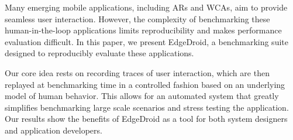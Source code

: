 
Many emerging mobile applications, including \glspl{AR} and \glspl{WCA}, aim to provide seamless user interaction.
However, the complexity of benchmarking these human-in-the-loop applications limits reproducibility and makes performance evaluation difficult. In this paper, we present EdgeDroid, a benchmarking suite designed to reproducibly evaluate these applications.

Our core idea rests on recording traces of user interaction, which are then replayed at benchmarking time in a controlled fashion based on an underlying model of human behavior. 
This allows for an automated system that greatly simplifies benchmarking large scale scenarios and stress testing the application.
Our results show the benefits of EdgeDroid as a tool for both system designers and application developers.
